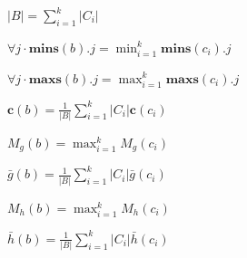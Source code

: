 \begin{centreditemize}

\item $\displaystyle |B| = \sum_{i=1}^k |C_i|$

\item $\displaystyle \forall j \cdot \mathbf{mins}(b).j = \min_{i=1}^k \mathbf{mins}(c_i).j$

\item $\displaystyle \forall j \cdot \mathbf{maxs}(b).j = \max_{i=1}^k \mathbf{maxs}(c_i).j$

\item $\displaystyle \mathbf{c}(b) = \frac{1}{|B|} \sum_{i=1}^k |C_i| \mathbf{c}(c_i)$

\item $\displaystyle M_g(b) = \max_{i=1}^k M_g(c_i)$

\item $\displaystyle \bar{g}(b) = \frac{1}{|B|} \sum_{i=1}^k |C_i| \bar{g}(c_i)$

\item $\displaystyle M_h(b) = \max_{i=1}^k M_h(c_i)$

\item $\displaystyle \bar{h}(b) = \frac{1}{|B|} \sum_{i=1}^k |C_i| \bar{h}(c_i)$

\end{centreditemize}

